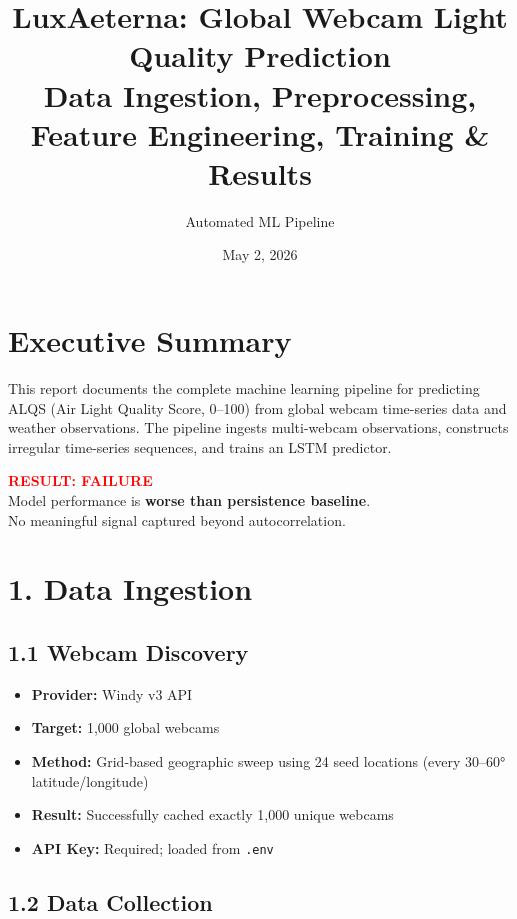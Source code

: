 \documentclass[11pt,a4paper]{article}
\title{\textbf{LuxAeterna: Global Webcam Light Quality Prediction}\\
\Large Data Ingestion, Preprocessing, Feature Engineering, Training \& Results}
\author{Automated ML Pipeline}
\date{May 2, 2026}
\begin{document}
\maketitle

\section{Executive Summary}

This report documents the complete machine learning pipeline for predicting ALQS (Air Light Quality Score, 0--100) from global webcam time-series data and weather observations. The pipeline ingests multi-webcam observations, constructs irregular time-series sequences, and trains an LSTM predictor.

\begin{center}
\Large\textbf{\textcolor{red}{RESULT: FAILURE}}\\
Model performance is \textbf{worse than persistence baseline}.\\
No meaningful signal captured beyond autocorrelation.
\end{center}

\section{1. Data Ingestion}

\subsection{1.1 Webcam Discovery}

\begin{itemize}
    \item \textbf{Provider:} Windy v3 API
    \item \textbf{Target:} 1,000 global webcams
    \item \textbf{Method:} Grid-based geographic sweep using 24 seed locations (every 30--60° latitude/longitude)
    \item \textbf{Result:} Successfully cached exactly 1,000 unique webcams
    \item \textbf{API Key:} Required; loaded from \texttt{.env}
\end{itemize}

\subsection{1.2 Data Collection}
\end{document}
